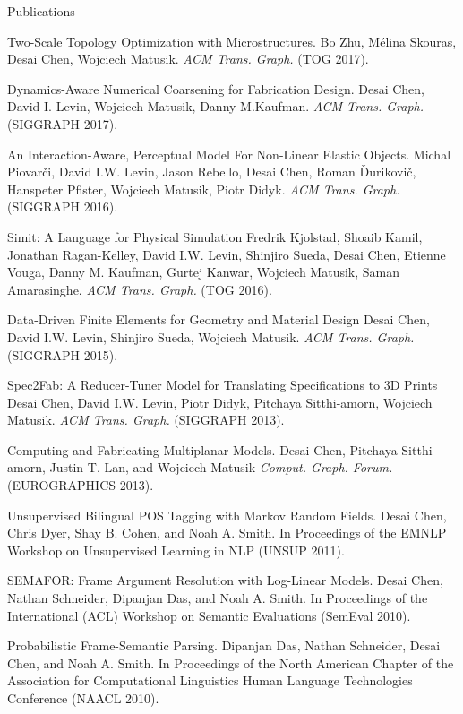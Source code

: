\documentclass{resume} %
\begin{document}
\begin{rSection}{Publications}
\item Two-Scale Topology Optimization with Microstructures. Bo Zhu, Mélina Skouras, Desai Chen, Wojciech Matusik. {\it ACM Trans. Graph.} (TOG 2017).
\item Dynamics-Aware Numerical Coarsening for Fabrication Design. Desai Chen, David I. Levin, Wojciech Matusik, Danny M.Kaufman.  {\it ACM Trans. Graph.} (SIGGRAPH 2017).
\item An Interaction-Aware, Perceptual Model For Non-Linear Elastic Objects. Michal Piovarči, David I.W. Levin, Jason Rebello, Desai Chen, Roman Ďurikovič, Hanspeter Pfister, Wojciech Matusik, Piotr Didyk. {\it ACM Trans. Graph.} (SIGGRAPH 2016).
\item Simit: A Language for Physical Simulation Fredrik Kjolstad, Shoaib Kamil, Jonathan Ragan-Kelley, David I.W. Levin, Shinjiro Sueda, Desai Chen, Etienne Vouga, Danny M. Kaufman, Gurtej Kanwar, Wojciech Matusik, Saman Amarasinghe. {\it ACM Trans. Graph.} (TOG 2016).
\item Data-Driven Finite Elements for Geometry and Material Design Desai Chen, David I.W. Levin, Shinjiro Sueda, Wojciech Matusik. {\it ACM Trans. Graph.} (SIGGRAPH 2015).
\item Spec2Fab: A Reducer-Tuner Model for Translating Specifications to 3D Prints Desai Chen, David I.W. Levin, Piotr Didyk, Pitchaya Sitthi-amorn, Wojciech Matusik. {\it ACM Trans. Graph.} (SIGGRAPH 2013).
\item Computing and Fabricating Multiplanar Models. Desai Chen, Pitchaya Sitthi-amorn, Justin T. Lan, and Wojciech Matusik {\it  Comput. Graph. Forum.} (EUROGRAPHICS 2013).
\item Unsupervised Bilingual POS Tagging with Markov Random Fields. Desai Chen, Chris Dyer, Shay B. Cohen, and Noah A. Smith. In Proceedings of the EMNLP Workshop on Unsupervised Learning in NLP (UNSUP 2011).
\item SEMAFOR: Frame Argument Resolution with Log-Linear Models. Desai Chen, Nathan Schneider, Dipanjan Das, and Noah A. Smith. In Proceedings of the International (ACL) Workshop on Semantic Evaluations (SemEval 2010).
\item Probabilistic Frame-Semantic Parsing. Dipanjan Das, Nathan Schneider, Desai Chen, and Noah A. Smith. In Proceedings of the North American Chapter of the Association for Computational Linguistics Human Language Technologies Conference (NAACL 2010).
\end{rSection}
\end{document}
